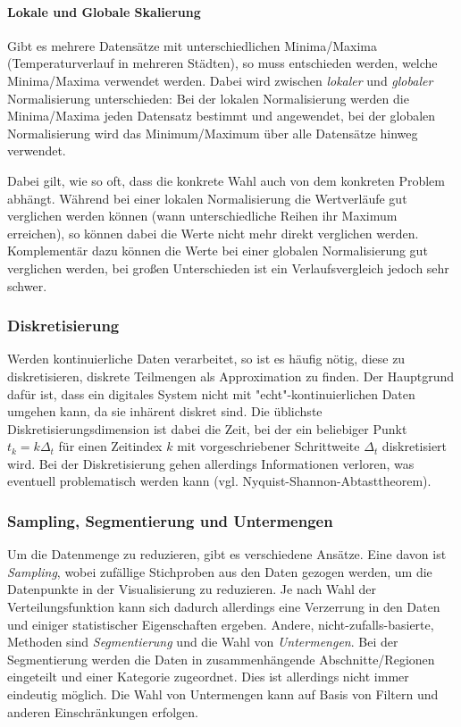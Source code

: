 			\paragraph{Lokale und Globale Skalierung}
				Gibt es mehrere Datensätze mit unterschiedlichen Minima/Maxima (\zB Temperaturverlauf in mehreren Städten), so muss entschieden werden, welche Minima/Maxima verwendet werden. Dabei wird zwischen \emph{lokaler} und \emph{globaler} Normalisierung unterschieden: Bei der lokalen Normalisierung werden die Minima/Maxima jeden Datensatz bestimmt und angewendet, bei der globalen Normalisierung wird das Minimum/Maximum über alle Datensätze hinweg verwendet.

				Dabei gilt, wie so oft, dass die konkrete Wahl auch von dem konkreten Problem abhängt. Während bei einer lokalen Normalisierung die Wertverläufe gut verglichen werden können (\dh wann unterschiedliche Reihen \zB ihr Maximum erreichen), so können dabei die Werte nicht mehr direkt verglichen werden. Komplementär dazu können die Werte bei einer globalen Normalisierung gut verglichen werden, bei großen Unterschieden ist ein Verlaufsvergleich jedoch sehr schwer.

		\subsubsection{Diskretisierung}
			Werden kontinuierliche Daten verarbeitet, so ist es häufig nötig, diese zu diskretisieren, \dh diskrete Teilmengen als Approximation zu finden. Der Hauptgrund dafür ist, dass ein digitales System nicht mit "echt"-kontinuierlichen Daten umgehen kann, da sie inhärent diskret sind. Die üblichste Diskretisierungsdimension ist dabei die Zeit, bei der ein beliebiger Punkt \( t_k = k \Delta_t \) für einen Zeitindex \(k\) mit vorgeschriebener Schrittweite \(\Delta_t\) diskretisiert wird. Bei der Diskretisierung gehen allerdings Informationen verloren, was eventuell problematisch werden kann (vgl. Nyquist-Shannon-Abtasttheorem).

		\subsubsection{Sampling, Segmentierung und Untermengen}
			Um die Datenmenge zu reduzieren, gibt es verschiedene Ansätze. Eine davon ist \emph{Sampling}, wobei zufällige Stichproben aus den Daten gezogen werden, um die Datenpunkte in der Visualisierung zu reduzieren. Je nach Wahl der Verteilungsfunktion kann sich dadurch allerdings eine Verzerrung in den Daten und einiger statistischer Eigenschaften ergeben. Andere, nicht-zufalls-basierte, Methoden sind \emph{Segmentierung} und die Wahl von \emph{Untermengen}. Bei der Segmentierung werden die Daten in zusammenhängende Abschnitte/Regionen eingeteilt und einer Kategorie zugeordnet. Dies ist allerdings nicht immer eindeutig möglich. Die Wahl von Untermengen kann \bspw auf Basis von Filtern und anderen Einschränkungen erfolgen.


